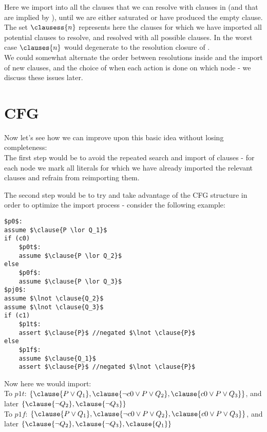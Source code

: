 \noindent 
Here we import into  all the clauses that we can resolve with clauses in  (and that are implied by ), until we are either saturated or have produced the empty clause. The set $\clausess{n}$ represents here the clauses for which we have imported all potential clauses to resolve, and resolved with all possible clauses.
In the worst case $\clauses{n}$ would degenerate to the resolution closure of .\\
We could somewhat alternate the order between resolutions inside  and the import of new clauses, and the choice of when each action is done on which node - we discuss these issues later.

\section{CFG}
Now let's see how we can improve upon this basic idea without losing completeness:\\
The first step would be to avoid the repeated search and import of clauses - for each node we mark all literals for which we have already imported the relevant clauses and refrain from reimporting them.

The second step would be to try and take advantage of the CFG structure in order to optimize the import process - consider the following example:

\begin{lstlisting}[mathescape]
$p0$: 
assume $\clause{P \lor Q_1}$
if (c0)
	$p0t$:
	assume $\clause{P \lor Q_2}$
else
	$p0f$:
	assume $\clause{P \lor Q_3}$
$pj0$:
assume $\lnot \clause{Q_2}$
assume $\lnot \clause{Q_3}$
if (c1)
	$p1t$:
	assert $\clause{P}$ //negated $\lnot \clause{P}$
else
	$p1f$:
	assume $\clause{Q_1}$
	assert $\clause{P}$ //negated $\lnot \clause{P}$
\end{lstlisting}

Now here we would import:\\
To $p1t$: $\{ \clause{P \lor Q_1}, \clause{\lnot c0 \lor P \lor Q_2}, \clause{c0 \lor P \lor Q_3}\}$, and later $\{\clause{\lnot Q_2}, \clause{\lnot Q_3} \}$ \\
To $p1f$: $\{ \clause{P \lor Q_1}, \clause{\lnot c0 \lor P \lor Q_2}, \clause{c0 \lor P \lor Q_3}\}$, and later $\{\clause{\lnot Q_2}, \clause{\lnot Q_3}, \clause{Q_1} \}$ 


